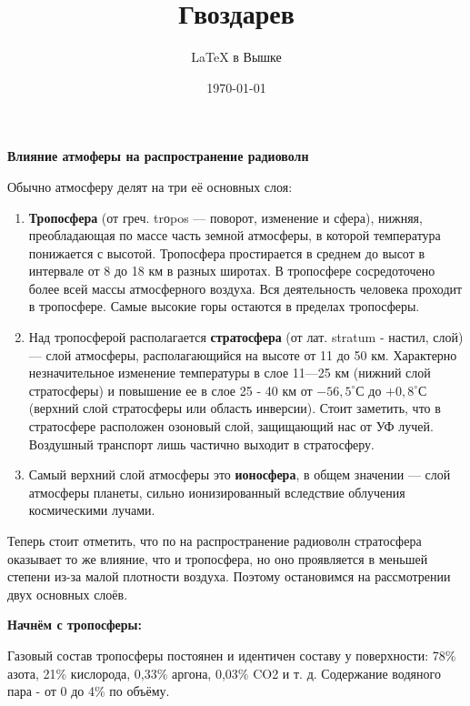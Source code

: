 \documentclass[a4paper,12pt]{article} %
\author{\LaTeX{} в Вышке}
\title{Гвоздарев}
\date{\today}
\begin{document}

\begin{flushright}
\large{\textbf{Влияние атмоферы на распространение радиоволн}}
\end{flushright}

Обычно атмосферу делят на три её основных слоя: \

\begin{enumerate}

\item\textbf{Тропосфера} (от греч. trоpos — поворот, изменение и сфера), нижняя, преобладающая по массе часть земной атмосферы, в которой температура понижается с высотой. Тропосфера простирается в среднем до высот в интервале от 8 до 18 км в разных широтах. В тропосфере сосредоточено более всей массы атмосферного воздуха. Вся деятельность человека проходит в тропосфере. Самые высокие горы остаются в пределах тропосферы.

\item Над тропосферой располагается \textbf{стратосфера} (от лат. stratum - настил, слой) — слой атмосферы, располагающийся на высоте от 11 до 50 км. Характерно незначительное изменение температуры в слое 11—25 км (нижний слой стратосферы) и повышение ее в слое 25 - 40 км от \(-56,5^{\circ}С\) до \(+0,8^{\circ}\)С (верхний слой стратосферы или область инверсии). Стоит заметить, что в стратосфере расположен озоновый слой, защищающий нас от УФ лучей. Воздушный транспорт лишь частично выходит в стратосферу. 

\item Самый верхний слой атмосферы это \textbf{ионосфера}, в общем значении — слой атмосферы планеты, сильно ионизированный вследствие облучения космическими лучами. 

\end{enumerate}

Теперь стоит отметить, что по на распространение радиоволн стратосфера оказывает то же влияние, что и тропосфера, но оно проявляется в меньшей степени из-за малой плотности воздуха. Поэтому остановимся на рассмотрении двух основных слоёв. \

\begin{flushleft}
\textbf{Начнём с тропосферы:}
\end{flushleft}

Газовый состав тропосферы постоянен и идентичен сос­таву у поверхности: 78\% азота, 21\% кислорода, 0,33\% аргона, 0,03\% CO2 и т. д. Содержание водяного пара - от 0 до 4\% по объ­ёму. \
\end{document}
